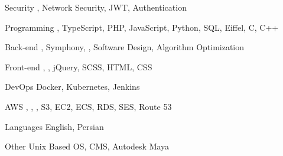 

\begin{cvskills}

\cvskill
  {Security} %
  {, Network Security, JWT, Authentication} %

\cvskill
  {Programming} %
  {, TypeScript, PHP, JavaScript, Python, SQL, Eiffel, C, C++} %

\cvskill
  {Back-end} %
  {, Symphony, , Software Design, Algorithm Optimization} %

\cvskill
  {Front-end} %
  {, , jQuery, SCSS, HTML, CSS} %

\cvskill
  {DevOps} %
  {Docker, Kubernetes, Jenkins} %

\cvskill
  {AWS} %
  {, , , S3, EC2, ECS, RDS, SES, Route 53} %

\cvskill
  {Languages} %
  {English, Persian} %

\cvskill
  {Other} %
  {Unix Based OS, CMS, Autodesk Maya} %

\end{cvskills}
